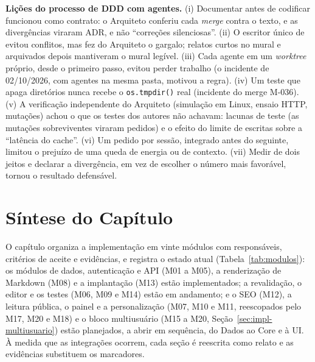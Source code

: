 \textbf{Lições do processo de DDD com agentes.} (i) Documentar antes de codificar funcionou como contrato: o Arquiteto conferiu cada \emph{merge} contra o texto, e as divergências viraram ADR, e não ``correções silenciosas''. (ii) O escritor único de  evitou conflitos, mas fez do Arquiteto o gargalo; relatos curtos no mural e arquivados depois mantiveram o mural legível. (iii) Cada agente em um \emph{worktree} próprio, desde o primeiro passo, evitou perder trabalho (o incidente de 02/10/2026, com agentes na mesma pasta, motivou a regra). (iv) Um teste que apaga diretórios nunca recebe o \texttt{os.tmpdir()} real (incidente do merge M-036). (v) A verificação independente do Arquiteto (simulação em Linux, ensaio HTTP, mutações) achou o que os testes dos autores não achavam: lacunas de teste (as mutações sobreviventes viraram pedidos) e o efeito do limite de escritas sobre a ``latência do cache''. (vi) Um pedido por sessão, integrado antes do seguinte, limitou o prejuízo de uma queda de energia ou de contexto. (vii) Medir de dois jeitos e declarar a divergência, em vez de escolher o número mais favorável, tornou o resultado defensável.

\section{Síntese do Capítulo}

O capítulo organiza a implementação em vinte módulos com responsáveis, critérios de aceite e evidências, e registra o estado atual (Tabela~\ref{tab:modulos}): os módulos de dados, autenticação e API (M01 a M05), a renderização de Markdown (M08) e a implantação (M13) estão implementados; a revalidação, o editor e os testes (M06, M09 e M14) estão em andamento; e o SEO (M12), a leitura pública, o painel e a personalização (M07, M10 e M11, reescopados pelo M17, M20 e M18) e o bloco multiusuário (M15 a M20, Seção~\ref{sec:impl-multiusuario}) estão planejados, a abrir em sequência, do Dados ao Core e à UI. À medida que as integrações ocorrem, cada seção é reescrita como relato e as evidências substituem os marcadores.
